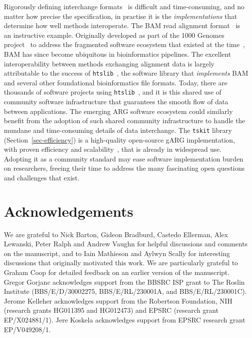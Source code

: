 \documentclass{article}
\begin{document}
Rigorously defining interchange formats~\cite[e.g.][]{kelleher2019htsget}
is difficult and time-consuming,
and no matter how precise the specification, in practise
it is the \emph{implementations} that determine how well methods
interoperate. The BAM read alignment format~\citep{li2009sequence}
is an instructive example. Originally developed as part of the
1000 Genomes project~\citep{10002015global} to address the fragmented
software ecosystem that existed at the time~\citep{danecek2021twelve},
BAM has since become ubiquitous in bioinformatics pipelines.
The excellent interoperability between methods
exchanging alignment data is largely attributable to the
success of \texttt{htslib}~\citep{bonfield2021htslib}, the
software library that \emph{implements} BAM and several other
foundational bioinformatics file formats.
Today, there are thousands of software projects
using \texttt{htslib}~\citep{bonfield2021htslib},
and it is this shared use of community software
infrastructure that guarantees the smooth flow of data between
applications.
The emerging ARG software ecosystem could similarly benefit
from the adoption of such shared community infrastructure
to handle the mundane and time-consuming details of data interchange.
The \texttt{tskit} library (Section~\ref{sec-efficiency})
is a high-quality open-source gARG implementation,
with proven efficiency and
scalability~\citep[e.g.][]{anderson2022genes,zhan2023towards},
that is already in widespread use.
Adopting it as a community standard may ease software implementation burden
on researchers, freeing their time to address the many fascinating open
questions and challenges that exist.

\section*{Acknowledgements}
We are grateful to Nick Barton, Gideon Bradburd, 
Castedo Ellerman, Alex Lewanski,
Peter Ralph and Andrew Vaughn
for helpful discussions and comments on the manuscript, and
to Iain Mathieson and Aylwyn Scally for interesting discussions that
originally motivated this work.
We are particularly grateful to Graham Coop for detailed feedback
on an earlier version of the manuscript.
Gregor Gorjanc acknowledges support from the BBSRC ISP grant to The Roslin Institute
(BBS/E/D/30002275, BBS/E/RL/230001A, and BBS/E/RL/230001C).
Jerome Kelleher acknowledges support from the Robertson Foundation,
NIH (research grants HG011395 and HG012473) and
EPSRC (research grant EP/X024881/1).
Jere Koskela acknowledges support from EPSRC research grant EP/V049208/1.
\end{document}
